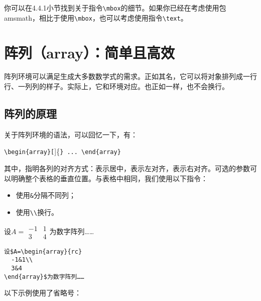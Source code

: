 你可以在4.4.1小节找到关于指令\verb|\mbox|的细节。如果你已经在考虑使用包\textsf{amsmath}，相比于使用\verb|\mbox|，也可以考虑使用指令\verb|\text|。

\section{阵列（array）：简单且高效}

阵列环境可以满足生成大多数数学式的需求。正如其名，它可以将对象排列成一行行、一列列的样子。实际上，它和环境对应。也正如一样，也不会换行。

\subsection{阵列的原理}

关于阵列环境的语法，可以回忆一下，有：

\begin{dmd}
\verb|\begin{array}[|]\{\verb|} ... \end{array}|
\end{dmd}

其中，指明各列的对齐方式：表示居中，表示左对齐，表示右对齐。可选的参数可以明确整个表格的垂直位置。与表格中相同，我们使用以下指令：

\begin{itemize}
  \item 使用\verb|&|分隔不同列；
  \item 使用\verb|\\|换行。
\end{itemize}

\begin{codelist}[3.14]{
  设$A=\begin{array}{rc}
    -1&1\\
    3&4
  \end{array}$为数字阵列……
}\begin{verbatim}
设$A=\begin{array}{rc}
  -1&1\\
  3&4
\end{array}$为数字阵列……
\end{verbatim}
\end{codelist}

以下示例使用了省略号：

